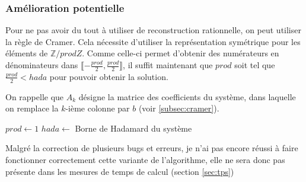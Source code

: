\documentclass[french]{article}
\begin{document}
\subsubsection{Amélioration potentielle} \label{subsubsec:modalg3}
Pour ne pas avoir du tout à utiliser de reconstruction rationnelle, on peut utiliser la règle de Cramer. Cela nécessite d'utiliser la représentation symétrique pour les éléments de $\mathbb{Z}/prodZ$. Comme celle-ci permet d'obtenir des numérateurs en dénominateurs dans $\llbracket-\frac{prod}{2},\frac{prod}{2}\rrbracket$, il suffit maintenant que $prod$ soit tel que $\frac{prod}{2} < hada$ pour pouvoir obtenir la solution.
\par
On rappelle que $A_k$ désigne la matrice des coefficients du système, dans laquelle on remplace la $k$-ième colonne par $b$ (voir \ref{subsec:cramer}).
\newline
\begin{algorithm}[H]
	\DontPrintSemicolon
	$prod \gets 1$
	$hada \gets$ Borne de Hadamard du système\\
\end{algorithm}
\leavevmode \par
Malgré la correction de plusieurs bugs et erreurs, je n'ai pas encore réussi à faire fonctionner correctement cette variante de l'algorithme, elle ne sera donc pas présente dans les mesures de temps de calcul (section \ref{sec:tps})
\end{document}

